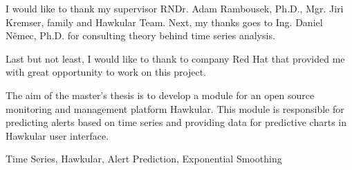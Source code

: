\documentclass[12pt,oneside]{fithesis2}
\begin{document}
\FrontMatter                    %
\ThesisTitlePage                %
\begin{ThesisDeclaration}       %
  \DeclarationText
  \AdvisorName
\end{ThesisDeclaration}

\begin{ThesisThanks}            %
  I would like to thank my supervisor RNDr. Adam Rambousek, Ph.D., Mgr. Jiri Kremser,
  family and Hawkular Team. Next, my thanks goes to Ing. Daniel Němec, Ph.D.
  for consulting theory behind time series analysis.

  Last but not least, I would like to thank to company Red Hat that provided me 
  with great opportunity to work on this project.
\end{ThesisThanks}

\begin{ThesisAbstract}          %
  The aim of the master's thesis is to develop a module for an open source monitoring
  and management platform Hawkular. This module is responsible for predicting
  alerts based on time series and providing data for predictive charts in Hawkular user interface.
\end{ThesisAbstract}

\begin{ThesisKeyWords}          %
  Time Series, Hawkular, Alert Prediction, Exponential Smoothing
\end{ThesisKeyWords}

\tableofcontents                %

\MainMatter                     %




%

\appendix

\end{document}
